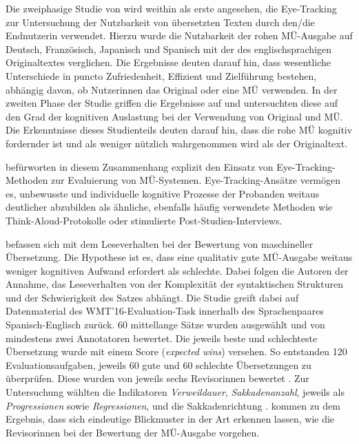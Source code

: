 Die zweiphasige Studie von \citet[]{doherty_user-based_2012} wird weithin als erste angesehen, die Eye-Tracking zur Untersuchung der Nutzbarkeit von übersetzten Texten durch den/die Endnutzer{\textperiodcentered}in verwendet. Hierzu wurde die Nutzbarkeit der rohen MÜ-Ausgabe auf Deutsch, Französisch, Japanisch und Spanisch mit der des englischsprachigen Originaltextes verglichen. Die Ergebnisse deuten darauf hin, dass wesentliche Unterschiede in puncto Zufriedenheit, Effizient und Zielführung bestehen, abhängig davon, ob Nutzer{\textperiodcentered}innen das Original oder eine MÜ verwenden. In der zweiten Phase der Studie griffen \citet[]{doherty_assessing_2014} die Ergebnisse auf und untersuchten diese auf den Grad der kognitiven Auslastung bei der Verwendung von Original und MÜ. Die Erkenntnisse dieses Studienteils deuten darauf hin, dass die rohe MÜ kognitiv fordernder ist und als weniger nützlich wahrgenommen wird als der Originaltext.

\begin{sloppypar}
\citet[14]{doherty_assessing_2014} befürworten in diesem Zusammenhang explizit den Einsatz von Eye-Tracking-Methoden zur Evaluierung von MÜ-Systemen. Eye-Tracking-Ansätze vermögen es, unbewusste und individuelle kognitive Prozesse der Probanden weitaus deutlicher abzubilden als ähnliche, ebenfalls häufig verwendete Methoden wie Think-Aloud-Protokolle oder stimulierte Post-Studien-Interviews.\end{sloppypar}

\citeauthor{sajjad_eyes_2016} befassen sich mit dem Leseverhalten bei der Bewertung von maschineller Übersetzung. Die Hypothese ist es, dass eine qualitativ gute MÜ-Ausgabe weitaus weniger kognitiven Aufwand erfordert als schlechte. Dabei folgen die Autoren der Annahme, das Leseverhalten von der Komplexität der syntaktischen Strukturen und der Schwierigkeit des Satzes abhängt. Die Studie greift dabei auf Datenmaterial des WMT’16-Evaluation-Task innerhalb des Sprachenpaares Spanisch-Englisch zurück. 60 mittellange Sätze wurden ausgewählt und von mindestens zwei Annotatoren bewertet. Die jeweils beste und schlechteste Übersetzung wurde mit einem Score (\emph{expected wins}) versehen. So entstanden 120 Evaluationsaufgaben, jeweils 60 gute und 60 schlechte Übersetzungen zu überprüfen. Diese wurden von jeweils sechs Revisor{\textperiodcentered}innen bewertet \citep[1084]{sajjad_eyes_2016}. Zur Untersuchung wählten \citeauthor{sajjad_eyes_2016} die Indikatoren \emph{Verweildauer}, \emph{Sakkadenanzahl}, jeweils als \emph{Progressionen} sowie \emph{Regressionen}, und die Sakkadenrichtung \citep[1083]{sajjad_eyes_2016}. \citeauthor{sajjad_eyes_2016} kommen zu dem Ergebnis, dass sich eindeutige Blickmuster in der Art erkennen lassen, wie die Revisor{\textperiodcentered}innen bei der Bewertung der MÜ-Ausgabe vorgehen.

